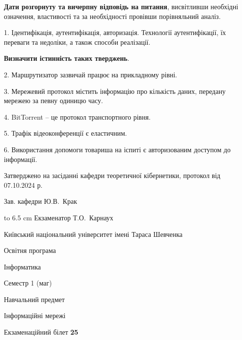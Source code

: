 \documentclass[12pt, ukrainian]{article}
\begin{document}
{
\qquad\textbf{Дати розгорнуту та вичерпну відповідь на питання}, висвітливши необхідні означення, властивості та за необхідності провівши порівняльний аналіз.

1. Ідентифікація, аутентифікація, авторизація. Технології аутентифікації, їх переваги та недоліки, а також способи реалізації.



\qquad\textbf{Визначити істинність таких тверджень}.

2. Маршрутизатор зазвичай працює на прикладному рівні.


3. Мережевий протокол містить інформацію про кількість даних, передану мережею за певну одиницю часу.


4. BitTorrent – це протокол транспортного рівня.


5. Трафік відеоконференції є еластичним.


6. Використання допомоги товариша на іспиті є авторизованим доступом до інформації.

}
{\smallskip\smallskip \begin {scriptsize} Затверджено на засіданні кафедри теоретичної кібернетики, протокол   від   07.10.2024 р.\par\smallskip\smallskip\smallskip\smallskip
{\parbox {6.5 cm} {Зав. кафедри \dotfill Ю.В.~Крак}}\hspace {0.7cm} {\hbox to 6.5 cm { Екзаменатор \dotfill Т.О.~Карнаух}} \end{scriptsize}}
\newpage
{{\begin {scriptsize}\par
{ \center  Київський національний університет імені Тараса Шевченка \par}
{\parbox {5 cm}{Освітня програма \hfill}{\parbox {7 cm}{Інформатика\hfill}}\parbox {6 cm}{\hfill Семестр 1 (маг)}}\par
{\parbox {5 cm} {Навчальний предмет \hfill}\parbox {7 cm}{Інформаційні мережі \hfill}\parbox {6cm}{\hfill}\par}\vspace{-15pt} \end{scriptsize}}{\center Екзаменаційний білет \No \textbf { 25 }\par}}
\end{document}
